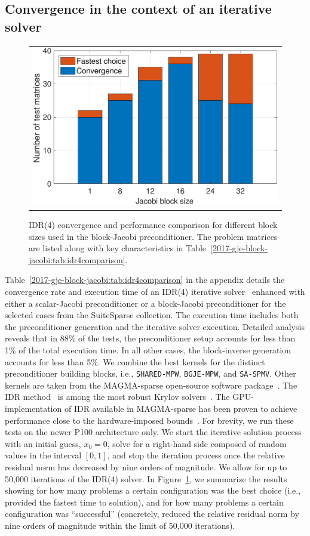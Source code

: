 \subsection{Convergence in the context of an iterative solver}
\begin{figure}
\begin{center}
\begin{tabular}{c}
\includegraphics[width=.46\columnwidth]{plots/solverperformance_bs.pdf}
\end{tabular}
\end{center}
\caption{
IDR(4) convergence and performance comparison for different block sizes used in the block-Jacobi preconditioner. 
The problem matrices are listed along with key characteristics in Table~\ref{2017-gje-block-jacobi:tab:idr4comparison}.
}
\label{2017-gje-block-jacobi:fig:solverperformance}
\end{figure}

Table~\ref{2017-gje-block-jacobi:tab:idr4comparison} in the appendix details the convergence rate and
execution time of an IDR(4) iterative solver~\cite{idr1} enhanced with either a
scalar-Jacobi preconditioner or a block-Jacobi preconditioner for the selected
cases from the SuiteSparse collection. The execution time includes both the
preconditioner generation and the iterative solver execution. 
Detailed analysis reveals that in 88\% of the tests, the preconditioner setup
accounts for less than 1\% of the total execution time. In all other cases, the
block-inverse generation accounts for less than 5\%.
We combine the best
kernels for the distinct preconditioner building blocks, i.e., {\tt SHARED-MPW},
{\tt BGJE-MPW}, and {\tt SA-SPMV}. Other kernels are taken from the MAGMA-sparse
open-source software package~\cite{magma}. The IDR method~\cite{idr} is among the 
most robust Krylov solvers~\cite{ashes2016}. The GPU-implementation of IDR available in
MAGMA-sparse has been proven to achieve performance close to the hardware-imposed
bounds~\cite{ijhpca2016}. For brevity, we run these tests on the newer P100
architecture only. We start the iterative solution process with an initial guess, 
$x_0=0$, solve for a right-hand side composed of random values in the interval
$[0,1]$, and stop the iteration process once the relative residual norm has
decreased by nine orders of magnitude. We allow for up to 50,000 iterations of
the IDR(4) solver. In Figure~\ref{2017-gje-block-jacobi:fig:solverperformance}, we summarize the
results showing for how many problems a certain configuration was the best
choice (i.e., provided the fastest time to solution), and for how many problems
a certain configuration was ``successful'' (concretely, reduced the relative
residual norm by nine orders of magnitude within the limit of 50,000
iterations).


